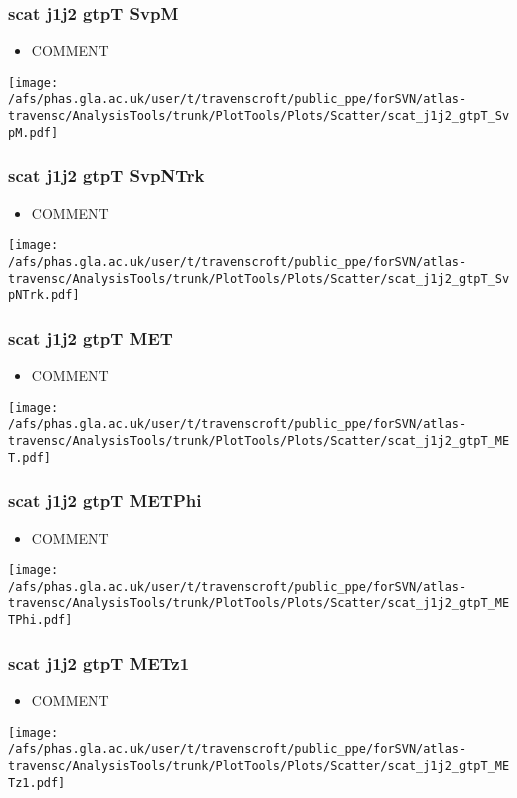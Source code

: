 \documentclass{beamer}
\begin{document}
\begin{frame}
\frametitle{scat j1j2 gtpT SvpM}
\begin{itemize}
\item COMMENT
\end{itemize}
\begin{center}
\texttt{[image: /afs/phas.gla.ac.uk/user/t/travenscroft/public\_ppe/forSVN/atlas-travensc/AnalysisTools/trunk/PlotTools/Plots/Scatter/scat\_j1j2\_gtpT\_SvpM.pdf]}
\end{center}
\end{frame}

\begin{frame}
\frametitle{scat j1j2 gtpT SvpNTrk}
\begin{itemize}
\item COMMENT
\end{itemize}
\begin{center}
\texttt{[image: /afs/phas.gla.ac.uk/user/t/travenscroft/public\_ppe/forSVN/atlas-travensc/AnalysisTools/trunk/PlotTools/Plots/Scatter/scat\_j1j2\_gtpT\_SvpNTrk.pdf]}
\end{center}
\end{frame}

\begin{frame}
\frametitle{scat j1j2 gtpT MET}
\begin{itemize}
\item COMMENT
\end{itemize}
\begin{center}
\texttt{[image: /afs/phas.gla.ac.uk/user/t/travenscroft/public\_ppe/forSVN/atlas-travensc/AnalysisTools/trunk/PlotTools/Plots/Scatter/scat\_j1j2\_gtpT\_MET.pdf]}
\end{center}
\end{frame}

\begin{frame}
\frametitle{scat j1j2 gtpT METPhi}
\begin{itemize}
\item COMMENT
\end{itemize}
\begin{center}
\texttt{[image: /afs/phas.gla.ac.uk/user/t/travenscroft/public\_ppe/forSVN/atlas-travensc/AnalysisTools/trunk/PlotTools/Plots/Scatter/scat\_j1j2\_gtpT\_METPhi.pdf]}
\end{center}
\end{frame}

\begin{frame}
\frametitle{scat j1j2 gtpT METz1}
\begin{itemize}
\item COMMENT
\end{itemize}
\begin{center}
\texttt{[image: /afs/phas.gla.ac.uk/user/t/travenscroft/public\_ppe/forSVN/atlas-travensc/AnalysisTools/trunk/PlotTools/Plots/Scatter/scat\_j1j2\_gtpT\_METz1.pdf]}
\end{center}
\end{frame}
\end{document}
